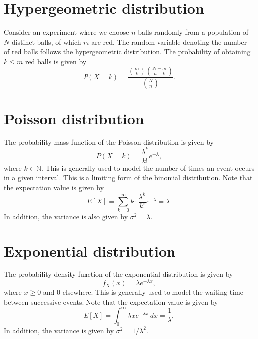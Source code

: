 \documentclass[11pt]{article}
\def\N{\mathbb{N}}
\newcommand\E[1]{E[#1]}
\theoremstyle{definition}
\theoremstyle{remark}
\numberwithin{equation}{module}
\begin{document}
    \section*{Hypergeometric distribution}
    Consider an experiment where we choose $n$ balls randomly from a population of
    $N$ distinct balls, of which $m$ are red. The random variable denoting the
    number of red balls follows the hypergeometric distribution.  The probability of
    obtaining $k \leq m$ red balls is given by \[
        P(X = k) = \frac{\binom{m}{k}\binom{N - m}{n - k}}{\binom{N}{n}}.
    \] 

    \section*{Poisson distribution}
    The probability mass function of the Poisson distribution is given by \[
        P(X = k) = \frac{\lambda^k}{k!}e^{-\lambda},
    \] where $k \in \N$. This is generally used to model the number of times an
    event occurs in a given interval. This is a limiting form of the binomial
    distribution. Note that the expectation value is given by \[
        \E{X} = \sum_{k = 0}^\infty k\cdot \frac{\lambda^k}{k!}e^{-\lambda} =
        \lambda.
    \] In addition, the variance is also given by $\sigma^2 = \lambda$.

    \section*{Exponential distribution}
    The probability density function of the exponential distribution is given by \[
        f_X(x) = \lambda e^{-\lambda x}, 
    \] where $x \geq 0$ and $0$ elsewhere.
    This is generally used to model the waiting time between successive events.
    Note that the expectation value is given by \[
        \E{X} = \int_0^\infty \lambda x e^{-\lambda x}\:dx = \frac{1}{\lambda},
    \] In addition, the variance is given by $\sigma^2 = 1 /\lambda^2$.
\end{document}
